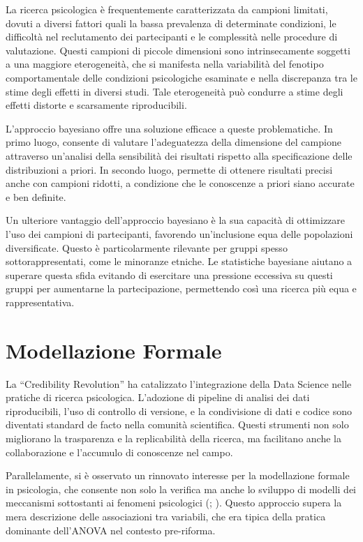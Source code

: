 \documentclass[
  letterpaper,
  DIV=11,
  numbers=noendperiod]{scrreprt}
\theoremstyle{definition}
\theoremstyle{remark}
\begin{document}
La ricerca psicologica è frequentemente caratterizzata da campioni
limitati, dovuti a diversi fattori quali la bassa prevalenza di
determinate condizioni, le difficoltà nel reclutamento dei partecipanti
e le complessità nelle procedure di valutazione. Questi campioni di
piccole dimensioni sono intrinsecamente soggetti a una maggiore
eterogeneità, che si manifesta nella variabilità del fenotipo
comportamentale delle condizioni psicologiche esaminate e nella
discrepanza tra le stime degli effetti in diversi studi. Tale
eterogeneità può condurre a stime degli effetti distorte e scarsamente
riproducibili.

L'approccio bayesiano offre una soluzione efficace a queste
problematiche. In primo luogo, consente di valutare l'adeguatezza della
dimensione del campione attraverso un'analisi della sensibilità dei
risultati rispetto alla specificazione delle distribuzioni a priori. In
secondo luogo, permette di ottenere risultati precisi anche con campioni
ridotti, a condizione che le conoscenze a priori siano accurate e ben
definite.

Un ulteriore vantaggio dell'approccio bayesiano è la sua capacità di
ottimizzare l'uso dei campioni di partecipanti, favorendo un'inclusione
equa delle popolazioni diversificate. Questo è particolarmente rilevante
per gruppi spesso sottorappresentati, come le minoranze etniche. Le
statistiche bayesiane aiutano a superare questa sfida evitando di
esercitare una pressione eccessiva su questi gruppi per aumentarne la
partecipazione, permettendo così una ricerca più equa e rappresentativa.

\section{Modellazione Formale}\label{modellazione-formale}

La ``Credibility Revolution'' ha catalizzato l'integrazione della Data
Science nelle pratiche di ricerca psicologica. L'adozione di pipeline di
analisi dei dati riproducibili, l'uso di controllo di versione, e la
condivisione di dati e codice sono diventati standard de facto nella
comunità scientifica. Questi strumenti non solo migliorano la
trasparenza e la replicabilità della ricerca, ma facilitano anche la
collaborazione e l'accumulo di conoscenze nel campo.

Parallelamente, si è osservato un rinnovato interesse per la
modellazione formale in psicologia, che consente non solo la verifica ma
anche lo sviluppo di modelli dei meccanismi sottostanti ai fenomeni
psicologici (; ). Questo approccio supera la mera descrizione delle associazioni
tra variabili, che era tipica della pratica dominante dell'ANOVA nel
contesto pre-riforma.
\end{document}
